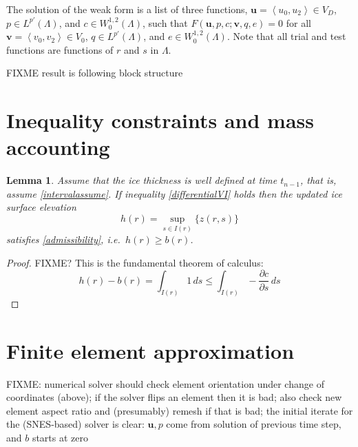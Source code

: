 \documentclass[letterpaper,final,12pt,reqno]{amsart}
\newcommand{\bu}{\mathbf{u}}
\newcommand{\bv}{\mathbf{v}}
\newtheorem{lemma}{Lemma}
\begin{document}
The solution of the weak form is a list of three functions, $\bu = \left<u_0,u_2\right> \in V_D$, $p\in L^{p'}(\Lambda)$, and $c\in W^{1,2}_0(\Lambda)$, such that $F(\bu,p,c;\bv,q,e) = 0$ for all $\bv = \left<v_0,v_2\right> \in V_0$,  $q\in L^{p'}(\Lambda)$, and $e \in W^{1,2}_0(\Lambda)$.  Note that all trial and test functions are functions of $r$ and $s$ in $\Lambda$.

FIXME result is following block structure


\section{Inequality constraints and mass accounting} \label{sec:inequalities}

\begin{lemma}
Assume that the ice thickness is well defined at time $t_{n-1}$, that is, assume
\eqref{intervalassume}.  If inequality \eqref{differentialVI} holds then the updated ice surface elevation
    $$h(r) = \sup_{s\in I(r)}\{z(r,s)\}$$
satisfies \eqref{admissibility}, i.e.~$h(r)\ge b(r)$.
\end{lemma}

\begin{proof}
FIXME? This is the fundamental theorem of calculus:
    $$h(r) - b(r) = \int_{I(r)} 1\,ds \le \int_{I(r)} - \frac{\partial c}{\partial s}\,ds$$
\end{proof}


\section{Finite element approximation}  \label{sec:finiteelement}

FIXME: numerical solver should check element orientation under change of coordinates (above); if the solver flips an element then it is bad; also check new element aspect ratio and (presumably) remesh if that is bad; the initial iterate for the (SNES-based) solver is clear: $\bu,p$ come from solution of previous time step, and $b$ starts at zero



\small

\bigskip


\end{document}
